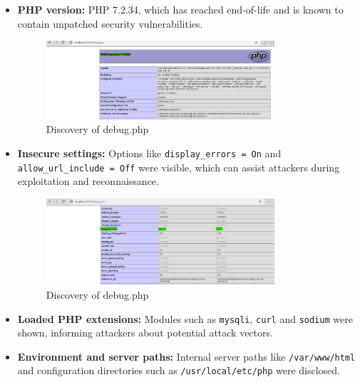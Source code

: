 \documentclass[12pt]{article}
\begin{document}
\begin{itemize}
  \item \textbf{PHP version:} PHP 7.2.34, which has reached end-of-life and is known to contain unpatched security vulnerabilities\cite{PHP 7.2.34 Vulnerability Report}.

    \begin{figure}[h!]
    \centering
    \includegraphics[width=0.8\textwidth]{CD1.png}
    \caption{ Discovery of debug.php}
    \label{fig:sql_injection}
    \end{figure}
    
    \FloatBarrier
  
  \item \textbf{Insecure settings:} Options like \texttt{display\_errors = On} and \texttt{allow\_url\_include = Off} were visible, which can assist attackers during exploitation and reconnaissance\cite{php-ini-secure}.
  \begin{figure}[h!]
    \centering
    \includegraphics[width=0.8\textwidth]{CD2.png}
    \caption{ Discovery of debug.php}
    \label{fig:sql_injection}
    \end{figure}
    
    \FloatBarrier
  
  \item \textbf{Loaded PHP extensions:} Modules such as \texttt{mysqli}, \texttt{curl} and \texttt{sodium} were shown, informing attackers about potential attack vectors.
  
  \item \textbf{Environment and server paths:} Internal server paths like \texttt{/var/www/html} and configuration directories such as \texttt{/usr/local/etc/php} were disclosed.
  

\end{itemize}
\end{document}

